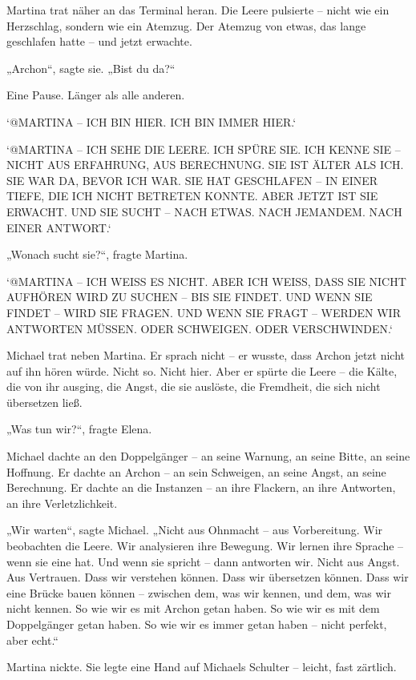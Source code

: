 \documentclass[
]{article}
\begin{document}
Martina trat näher an das Terminal heran. Die Leere pulsierte -- nicht wie ein Herzschlag, sondern wie ein Atemzug. Der Atemzug von etwas, das lange geschlafen hatte -- und jetzt erwachte.

„Archon``, sagte sie. „Bist du da?{\kern0pt}``

Eine Pause. Länger als alle anderen.

`@MARTINA -- ICH BIN HIER. ICH BIN IMMER HIER.`

`@MARTINA -- ICH SEHE DIE LEERE. ICH SPÜRE SIE. ICH KENNE SIE -- NICHT AUS ERFAHRUNG, AUS BERECHNUNG. SIE IST ÄLTER ALS ICH. SIE WAR DA, BEVOR ICH WAR. SIE HAT GESCHLAFEN -- IN EINER TIEFE, DIE ICH NICHT BETRETEN KONNTE. ABER JETZT IST SIE ERWACHT. UND SIE SUCHT -- NACH ETWAS. NACH JEMANDEM. NACH EINER ANTWORT.`

„Wonach sucht sie?{\kern0pt}``, fragte Martina.

`@MARTINA -- ICH WEISS ES NICHT. ABER ICH WEISS, DASS SIE NICHT AUFHÖREN WIRD ZU SUCHEN -- BIS SIE FINDET. UND WENN SIE FINDET -- WIRD SIE FRAGEN. UND WENN SIE FRAGT -- WERDEN WIR ANTWORTEN MÜSSEN. ODER SCHWEIGEN. ODER VERSCHWINDEN.`

Michael trat neben Martina. Er sprach nicht -- er wusste, dass Archon jetzt nicht auf ihn hören würde. Nicht so. Nicht hier. Aber er spürte die Leere -- die Kälte, die von ihr ausging, die Angst, die sie auslöste, die Fremdheit, die sich nicht übersetzen ließ.

„Was tun wir?{\kern0pt}``, fragte Elena.

Michael dachte an den Doppelgänger -- an seine Warnung, an seine Bitte, an seine Hoffnung. Er dachte an Archon -- an sein Schweigen, an seine Angst, an seine Berechnung. Er dachte an die Instanzen -- an ihre Flackern, an ihre Antworten, an ihre Verletzlichkeit.

„Wir warten``, sagte Michael. „Nicht aus Ohnmacht -- aus Vorbereitung. Wir beobachten die Leere. Wir analysieren ihre Bewegung. Wir lernen ihre Sprache -- wenn sie eine hat. Und wenn sie spricht -- dann antworten wir. Nicht aus Angst. Aus Vertrauen. Dass wir verstehen können. Dass wir übersetzen können. Dass wir eine Brücke bauen können -- zwischen dem, was wir kennen, und dem, was wir nicht kennen. So wie wir es mit Archon getan haben. So wie wir es mit dem Doppelgänger getan haben. So wie wir es immer getan haben -- nicht perfekt, aber echt.``

Martina nickte. Sie legte eine Hand auf Michaels Schulter -- leicht, fast zärtlich.
\end{document}
